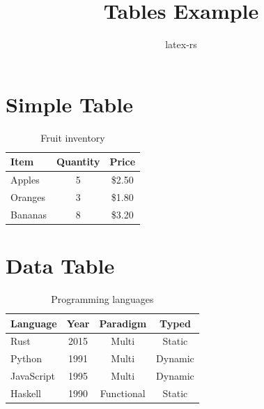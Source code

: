 \documentclass{article}
\title{Tables Example}
\author{latex-rs}
\begin{document}
\maketitle

\section{Simple Table}

\begin{table}[h]
\centering
\begin{tabular}{lcc}
\toprule
Item & Quantity & Price \\
\midrule
Apples & 5 & \$2.50 \\
Oranges & 3 & \$1.80 \\
Bananas & 8 & \$3.20 \\
\bottomrule
\end{tabular}
\caption{Fruit inventory}
\end{table}

\section{Data Table}

\begin{table}[h]
\centering
\begin{tabular}{lccc}
\toprule
Language & Year & Paradigm & Typed \\
\midrule
Rust & 2015 & Multi & Static \\
Python & 1991 & Multi & Dynamic \\
JavaScript & 1995 & Multi & Dynamic \\
Haskell & 1990 & Functional & Static \\
\bottomrule
\end{tabular}
\caption{Programming languages}
\end{table}
\end{document}
